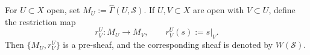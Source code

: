 For $U \subset X$ open, set $M_U := \hat{\Gamma}(U, \mathcal{S})$. If $U, V \subset X$ are open with $V \subset U$, define the restriction map
$$
r_V^U : M_U \to M_V, \qquad r_V^U(s) := s|_V.
$$
Then $\{M_U, r_V^U\}$ is a pre-sheaf, and the corresponding sheaf is denoted by $W(\mathcal{S})$.

